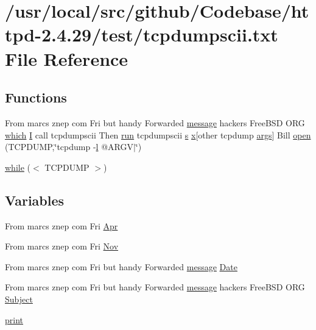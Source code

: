 \hypertarget{tcpdumpscii_8txt}{}\section{/usr/local/src/github/\+Codebase/httpd-\/2.4.29/test/tcpdumpscii.txt File Reference}
\label{tcpdumpscii_8txt}
\subsection*{Functions}
\begin{DoxyCompactItemize}
\item 
From marcs znep com Fri but handy Forwarded \hyperlink{pcregrep_8txt_a0a2f14d6be6096315101e08133f8d1bc}{message} hackers Free\+B\+SD O\+RG \hyperlink{README_8txt_a9d3df0d4bed2ac7e1c01860363ab4ac2}{which} \hyperlink{apr__md5_8c_ac0eafdc9ee161b71e7af98af736952fd}{I} call tcpdumpscii Then \hyperlink{pcretest_8txt_a5a989107465910839d799cefcea80d85}{run} tcpdumpscii \hyperlink{pcretest_8txt_a062597889ba244b72877454b1d3adecf}{s} \hyperlink{pcregrep_8txt_a4242e9148f20c002763bf4ba53b26ad6}{x}\mbox{[}other tcpdump \hyperlink{group__APR__Util__DBD_ga6b6dfca544bdc17e0e73e3ca56c2363d}{args}\mbox{]} Bill \hyperlink{tcpdumpscii_8txt_ad449568b4dd17e38bd893db222d79724}{open} (T\+C\+P\+D\+U\+MP,\char`\"{}tcpdump -\/\hyperlink{pcregrep_8txt_a486d9936a8632c227772a15831f78e11}{l} @A\+R\+GV$\vert$\char`\"{})
\item 
\hyperlink{tcpdumpscii_8txt_a4fdd7aa2abd5a87923ce470d2bdf6eb4}{while} ($<$ T\+C\+P\+D\+U\+MP $>$)
\end{DoxyCompactItemize}
\subsection*{Variables}
\begin{DoxyCompactItemize}
\item 
From marcs znep com Fri \hyperlink{tcpdumpscii_8txt_a3af40439b52f160ee453e318c1d901e0}{Apr}
\item 
From marcs znep com Fri \hyperlink{tcpdumpscii_8txt_a47fd35ffab23ee50b590f5c3e30dcc6b}{Nov}
\item 
From marcs znep com Fri but handy Forwarded \hyperlink{pcregrep_8txt_a0a2f14d6be6096315101e08133f8d1bc}{message} \hyperlink{tcpdumpscii_8txt_a922f0e1dba25fa21a1e033cbacf6d6e7}{Date}
\item 
From marcs znep com Fri but handy Forwarded \hyperlink{pcregrep_8txt_a0a2f14d6be6096315101e08133f8d1bc}{message} hackers Free\+B\+SD O\+RG \hyperlink{tcpdumpscii_8txt_a1f224259352450ebe38093f1e8a81be1}{Subject}
\item 
\hyperlink{tcpdumpscii_8txt_a3ad3a4240c0f97c7e85aff5c52a454d4}{print}
\end{DoxyCompactItemize}


